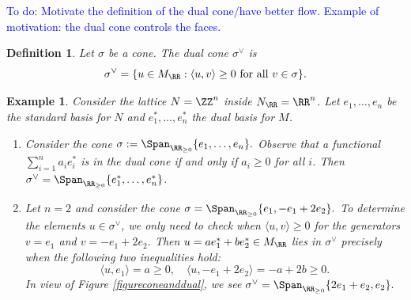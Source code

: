 \documentclass[12pt]{amsart}
\newcommand{\todo}[1]{\noindent  \textcolor{blue}{To do: #1}}
\theoremstyle{plain}
\newtheorem{definition}[theorem]{Definition}
\newtheorem{example}[theorem]{Example}
\begin{document}
\todo{Motivate the definition of the dual cone/have better flow. Example of motivation: the dual cone controls the faces.}

\begin{definition}
Let $\sigma$ be a cone.
The \emph{dual cone} $\sigma^\vee$ is
$$\sigma^\vee = \{u \in M_\RR : \langle u, v \rangle \ge 0 \text{ for all } v \in \sigma\}.$$
\end{definition}

\begin{example}
Consider the lattice $N = \ZZ^n$ inside $N_\RR = \RR^n$.
Let $e_1, \ldots, e_n$ be the standard basis for $N$ and $e_1^*, \ldots, e_n^*$ the dual basis for $M$.
\begin{enumerate}
\item
Consider the cone $\sigma := \Span_{\RR_{\ge 0}}\{e_1, \ldots, e_n\}.$
Observe that a functional $\sum_{i=1}^n a_i e_i^*$ is in the dual cone if and only if $a_i \ge 0$ for all $i$.
Then $\sigma^\vee = \Span_{\RR_{\ge 0}}\{e_1^*, \ldots, e_n^*\}$.

\item
Let $n = 2$ and consider the cone $\sigma = \Span_{\RR_{\ge 0}} \{e_1, - e_1 + 2 e_2\}.$
To determine the elements $u\in\sigma^\vee$, we only need to check when $\langle u, v \rangle \ge 0$ for the generators $v = e_1$ and $v = -e_1 + 2 e_2$.
Then $u = a e_1^* + b e_2^* \in M_\RR$ lies in $\sigma^\vee$ precisely when the following two inequalities hold:
$$\langle u, e_1 \rangle = a \ge 0, \quad \langle u, -e_1 + 2e_2 \rangle = -a + 2b \ge 0.$$
In view of Figure \ref{figureconeanddual}, we see  $\sigma^\vee = \Span_{\RR_{\ge 0}} \{2 e_1 + e_2, e_2\}.$
\end{enumerate}
\end{example}
\end{document}
